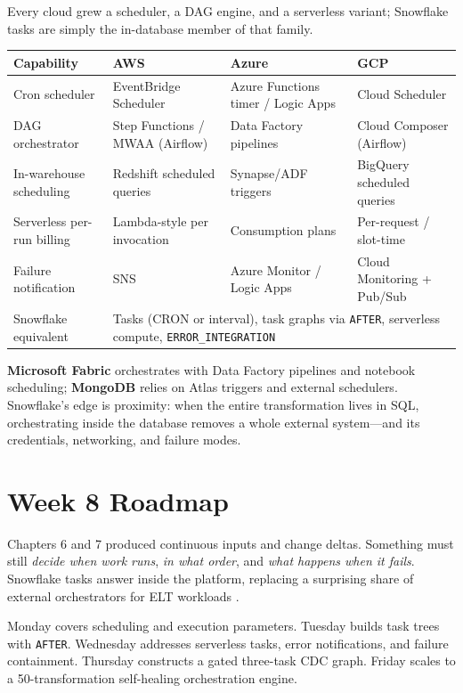 \begin{crosscloud}
Every cloud grew a scheduler, a DAG engine, and a serverless variant; Snowflake tasks are simply the in-database member of that family.

\vspace{2mm}
{\footnotesize
\begin{tabular}{@{}p{2.8cm}p{3.0cm}p{3.0cm}p{3.0cm}@{}}
\toprule
\textbf{Capability} & \textbf{AWS} & \textbf{Azure} & \textbf{GCP} \\
\midrule
Cron scheduler & EventBridge Scheduler & Azure Functions timer / Logic Apps & Cloud Scheduler \\
DAG orchestrator & Step Functions / MWAA (Airflow) & Data Factory pipelines & Cloud Composer (Airflow) \\
In-warehouse scheduling & Redshift scheduled queries & Synapse/ADF triggers & BigQuery scheduled queries \\
Serverless per-run billing & Lambda-style per invocation & Consumption plans & Per-request / slot-time \\
Failure notification & SNS & Azure Monitor / Logic Apps & Cloud Monitoring + Pub/Sub \\
\addlinespace
Snowflake equivalent & \multicolumn{3}{l}{Tasks (CRON or interval), task graphs via \texttt{AFTER}, serverless compute, \texttt{ERROR\_INTEGRATION}} \\
\bottomrule
\end{tabular}}

\vspace{1mm}
\textbf{Microsoft Fabric} orchestrates with Data Factory pipelines and notebook scheduling; \textbf{MongoDB} relies on Atlas triggers and external schedulers. Snowflake's edge is proximity: when the entire transformation lives in SQL, orchestrating inside the database removes a whole external system---and its credentials, networking, and failure modes.
\end{crosscloud}

\section{Week 8 Roadmap}
Chapters 6 and 7 produced continuous inputs and change deltas. Something must still \emph{decide when work runs}, \emph{in what order}, and \emph{what happens when it fails}. Snowflake tasks answer inside the platform, replacing a surprising share of external orchestrators for ELT workloads \cite{snowflakeTasksDocs}.

Monday covers scheduling and execution parameters. Tuesday builds task trees with \texttt{AFTER}. Wednesday addresses serverless tasks, error notifications, and failure containment. Thursday constructs a gated three-task CDC graph. Friday scales to a 50-transformation self-healing orchestration engine.

